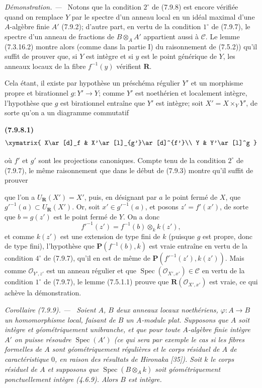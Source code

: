 \documentclass[10pt,oneside]{book}
\newcommand{\oldpage}[2][]{%
  \setcounter{footnote}{0}%
  \marginpar{\scriptsize\textbf{#1}~|~#2}\ignorespaces}
\newenvironment{env}[1][]{\par\medskip\noindent\textbf{(#1)}\ }{\par}
\newenvironment{corollary}[1][]{%
  \par\medskip\noindent\itshape Corollaire (#1). ---\ }{\par}
\newenvironment{proof}{%
  \par\medskip\noindent\textit{Démonstration. ---\ }}{\par}
\begin{document}
\begin{proof}
Notons que la condition $2^\circ$ de (7.9.8) est encore vérifiée quand on
remplace $Y$ par le spectre d'un anneau local en un idéal maximal d'une
$A$-algèbre finie $A'$ (7.9.2); d'autre part, en vertu de la condition
$1^\circ$ de (7.9.7), le spectre d'un anneau de fractions de
$B\otimes_AA'$ appartient aussi à $\mathcal C$. Le lemme (7.3.16.2) montre
alors (comme dans la partie I) du raisonnement de (7.5.2)) qu'il suffit de
prouver que, si $Y$ est intègre et si $y$ est le point générique de $Y$, les
anneaux locaux de la fibre $f^{-1}(y)$ vérifient $\boldsymbol R$.

Cela étant, il existe par hypothèse un préschéma régulier $Y'$ et un morphisme
propre et birationnel $g:Y'\to Y$; comme $Y'$ est noethérien et localement
intègre, l'hypothèse que $g$ est birationnel entraîne que $Y'$ est intègre;
soit $X'=X\times_YY'$, de sorte qu'on a un diagramme commutatif

\begin{env}[7.9.8.1]
\label{IV.2.s7.9.8.1-fr}
\[
\xymatrix{
X\ar[d]_f & X'\ar[l]_{g'}\ar[d]^{f'}\\
Y & Y'\ar[l]^g
}
\]
\end{env}

où $f'$ et $g'$ sont les projections canoniques. Compte tenu de la condition
$2^\circ$ de (7.9.7), le même raisonnement que dans le début de (7.9.3) montre
qu'il suffit de prouver

\oldpage[IV-2]{222}

que l'on a $U_{\boldsymbol R}(X')=X'$, puis, en désignant par $a$ le point
fermé de $X$, que $g'^{-1}(a)\subset U_{\boldsymbol R}(X')$. Or, soit
$x'\in g'^{-1}(a)$, et posons $z'=f'(x')$, de sorte que $b=g(z')$ est le
point fermé de $Y$. On a donc
\[
f'^{-1}(z')=f^{-1}(b)\otimes_k k(z'),
\]
et comme $k(z')$ est une extension de type fini de $k$ (puisque $g$ est
propre, donc de type fini), l'hypothèse que $\boldsymbol P(f^{-1}(b),k)$ est
vraie entraîne en vertu de la condition $4^\circ$ de (7.9.7), qu'il en est de
même de $\boldsymbol P(f'^{-1}(z'),k(z'))$. Mais comme
$\mathcal O_{Y',z'}$ est un anneau régulier et que
$\operatorname{Spec}(\mathcal O_{X',x'})\in\mathcal C$ en vertu de la
condition $1^\circ$ de (7.9.7), le lemme (7.5.1.1) prouve que
$\boldsymbol R(\mathcal O_{X',x'})$ est vraie, ce qui achève la démonstration.
\end{proof}

\begin{corollary}[7.9.9]
\label{IV.2.s7.9.9-fr}
Soient $A$, $B$ deux anneaux locaux noethériens, $\varphi:A\to B$ un
homomorphisme local, faisant de $B$ un $A$-module plat. Supposons que $A$ soit
intègre et géométriquement unibranche, et que pour toute $A$-algèbre finie
intègre $A'$ on puisse résoudre $\operatorname{Spec}(A')$ (ce qui sera par
exemple le cas si les fibres formelles de $A$ sont géométriquement régulières
et le corps résiduel de $A$ de caractéristique $0$, en raison des résultats de
Hironaka [35]). Soit $k$ le corps résiduel de $A$ et supposons que
$\operatorname{Spec}(B\otimes_Ak)$ soit géométriquement ponctuellement intègre
(4.6.9). Alors $B$ est intègre.
\end{corollary}
\end{document}
